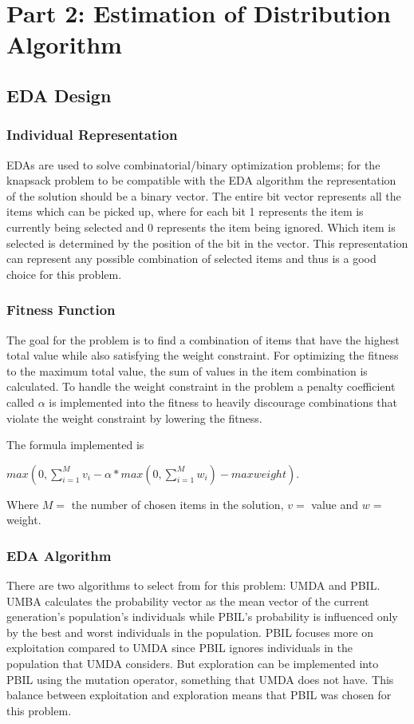 \documentclass{article}
\begin{document}
\section*{Part 2: Estimation of Distribution Algorithm}
\subsection*{EDA Design}
\subsubsection*{Individual Representation}
EDAs are used to solve combinatorial/binary optimization problems; for the knapsack problem to be compatible with the EDA algorithm the representation of the solution should be a binary vector. The entire bit vector represents all the items which can be picked up, where for each bit 1 represents the item is currently being selected and 0 represents the item being ignored. Which item is selected is determined by the position of the bit in the vector. This representation can represent any possible combination of selected items and thus is a good choice for this problem. \par
\subsubsection*{Fitness Function}
The goal for the problem is to find a combination of items that have the highest total value while also satisfying the weight constraint. For optimizing the fitness to the maximum total value, the sum of values in the item combination is calculated. To handle the weight constraint in the problem a penalty coefficient called $\alpha$ is implemented into the fitness to heavily discourage combinations that violate the weight constraint by lowering the fitness. \par 
\noindent The formula implemented is 
\begin{center}
$max(0, \sum_{i=1}^{M}v_i - \alpha *max(0,\sum_{i=1}^{M}w_i)-max weight)$. 
\end{center}
Where $M=$ the number of chosen items in the solution, $v=$ value and $w=$ weight.
\subsubsection*{EDA Algorithm}
There are two algorithms to select from for this problem: UMDA and PBIL. UMBA calculates the probability vector as the mean vector of the current generation’s population’s individuals while PBIL's probability is influenced only by the best and worst individuals in the population. PBIL focuses more on exploitation compared to UMDA since PBIL ignores individuals in the population that UMDA considers. But exploration can be implemented into PBIL using the mutation operator, something that UMDA does not have. This balance between exploitation and exploration means that PBIL was chosen for this problem. \par
\end{document}
